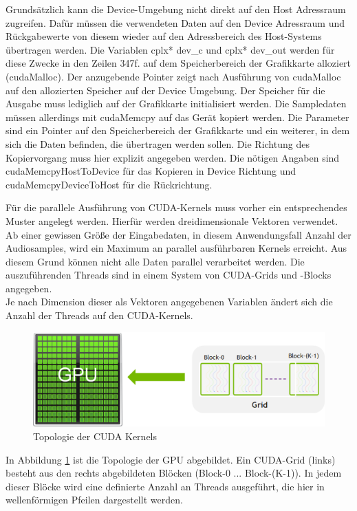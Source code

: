 Grundsätzlich kann die Device-Umgebung nicht direkt auf den Host Adressraum zugreifen. Dafür müssen die verwendeten Daten auf den Device Adressraum und Rückgabewerte von diesem wieder auf den Adressbereich des Host-Systems übertragen werden. Die Variablen cplx* dev\_c und cplx* dev\_out werden für diese Zwecke in den Zeilen 347f. auf dem Speicherbereich der Grafikkarte alloziert (cudaMalloc). Der anzugebende Pointer zeigt nach Ausführung von cudaMalloc auf den allozierten Speicher auf der Device Umgebung. Der Speicher für die Ausgabe muss lediglich auf der Grafikkarte initialisiert werden. Die Sampledaten müssen allerdings mit cudaMemcpy auf das Gerät kopiert werden. Die Parameter sind ein Pointer auf den Speicherbereich der Grafikkarte und ein weiterer, in dem sich die Daten befinden, die übertragen werden sollen. Die Richtung des Kopiervorgang muss hier explizit angegeben werden. Die nötigen Angaben sind cudaMemcpyHostToDevice für das Kopieren in Device Richtung und cudaMemcpyDeviceToHost für die Rückrichtung.

Für die parallele Ausführung von CUDA-Kernels muss vorher ein entsprechendes Muster angelegt werden. Hierfür werden dreidimensionale Vektoren verwendet. Ab einer gewissen Größe der Eingabedaten, in diesem Anwendungsfall Anzahl der Audiosamples, wird ein Maximum an parallel ausführbaren Kernels erreicht. Aus diesem Grund können nicht alle Daten parallel verarbeitet werden. Die auszuführenden Threads sind in einem System von CUDA-Grids und -Blocks angegeben. \\Je nach Dimension dieser als Vektoren angegebenen Variablen ändert sich die Anzahl der Threads auf den CUDA-Kernels. 

\begin{figure}[hbt!]
	\centering      
	\includegraphics[scale=0.5]{figures/cudaGrid.png}
	\caption{Topologie der CUDA Kernels \cite{nvidia_docs_grid}}
	\label{fig:cudaGrids}
\end{figure}

In Abbildung \ref{fig:cudaGrids} ist die Topologie der GPU abgebildet. Ein CUDA-Grid (links) besteht aus den rechts abgebildeten Blöcken (Block-0 ... Block-(K-1)). In jedem dieser Blöcke wird eine definierte Anzahl an Threads ausgeführt, die hier in wellenförmigen Pfeilen dargestellt werden. 

